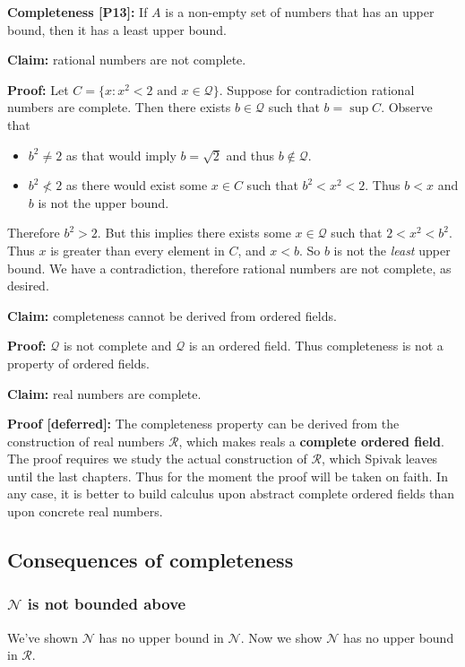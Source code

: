 \vs

\textbf{Completeness [P13]:} If $A$ is a non-empty set of numbers that
has an upper bound, then it has a least upper bound.

\vs

\textbf{Claim:} rational numbers are not complete.

\textbf{Proof:} Let $C=\{x:x^{2}<2\text{ and }x\in\mathcal{Q}\}$. Suppose for
contradiction rational numbers are complete. Then there exists
$b\in\mathcal{Q}$ such that $b=\sup C$. Observe that
\begin{itemize}
\item $b^{2}\neq2$ as that would imply $b=\sqrt{2}$ and thus $b\notin\mathcal{Q}$.
\item $b^{2}\not<2$ as there would exist some $x\in C$ such that
  $b^{2}<x^{2}<2$. Thus $b<x$ and $b$ is not the upper bound.
\end{itemize}

Therefore $b^{2}>2$. But this implies there exists some
$x\in\mathcal{Q}$ such that $2<x^{2}<b^{2}$. Thus $x$ is greater than every
element in $C$, and $x<b$. So $b$ is not the \textit{least} upper
bound. We have a contradiction, therefore rational numbers are not
complete, as desired.

\vs

\textbf{Claim:} completeness cannot be derived from ordered fields.

\textbf{Proof:} $\mathcal{Q}$ is not complete and $\mathcal{Q}$ is an ordered field. Thus
completeness is not a property of ordered fields.

\vs

\textbf{Claim:} real numbers are complete.

\textbf{Proof [deferred]:} The completeness property can be derived
from the construction of real numbers $\mathcal{R}$, which makes reals a
\textbf{complete ordered field}. The proof requires we study the
actual construction of $\mathcal{R}$, which Spivak leaves until the last
chapters. Thus for the moment the proof will be taken on faith. In any
case, it is better to build calculus upon abstract complete ordered
fields than upon concrete real numbers.

\subsection{Consequences of completeness}

\subsubsection*{$\mathcal{N}$ is not bounded above}
We've shown $\mathcal{N}$ has no upper bound in $\mathcal{N}$. Now we
show $\mathcal{N}$ has no upper bound in $\mathcal{R}$.

